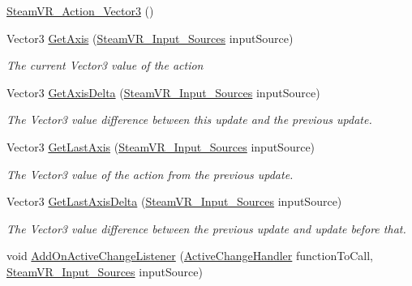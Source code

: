 \begin{DoxyCompactItemize}
\item 
\mbox{\hyperlink{class_valve_1_1_v_r_1_1_steam_v_r___action___vector3_ad1151513dd5f37e8d04c7db2ee98590c}{Steam\+V\+R\+\_\+\+Action\+\_\+\+Vector3}} ()
\item 
Vector3 \mbox{\hyperlink{class_valve_1_1_v_r_1_1_steam_v_r___action___vector3_ade2feaacf2acea8cd4baceb3d861fa20}{Get\+Axis}} (\mbox{\hyperlink{namespace_valve_1_1_v_r_a82e5bf501cc3aa155444ee3f0662853f}{Steam\+V\+R\+\_\+\+Input\+\_\+\+Sources}} input\+Source)
\begin{DoxyCompactList}\small\item\em The current Vector3 value of the action \end{DoxyCompactList}\item 
Vector3 \mbox{\hyperlink{class_valve_1_1_v_r_1_1_steam_v_r___action___vector3_ac8df802433c105f70c635dd4919cf433}{Get\+Axis\+Delta}} (\mbox{\hyperlink{namespace_valve_1_1_v_r_a82e5bf501cc3aa155444ee3f0662853f}{Steam\+V\+R\+\_\+\+Input\+\_\+\+Sources}} input\+Source)
\begin{DoxyCompactList}\small\item\em The Vector3 value difference between this update and the previous update. \end{DoxyCompactList}\item 
Vector3 \mbox{\hyperlink{class_valve_1_1_v_r_1_1_steam_v_r___action___vector3_aa1b08a373d780aa48b52284b65e59434}{Get\+Last\+Axis}} (\mbox{\hyperlink{namespace_valve_1_1_v_r_a82e5bf501cc3aa155444ee3f0662853f}{Steam\+V\+R\+\_\+\+Input\+\_\+\+Sources}} input\+Source)
\begin{DoxyCompactList}\small\item\em The Vector3 value of the action from the previous update. \end{DoxyCompactList}\item 
Vector3 \mbox{\hyperlink{class_valve_1_1_v_r_1_1_steam_v_r___action___vector3_a0c287b4a3eb4bffb3da860ae73f28981}{Get\+Last\+Axis\+Delta}} (\mbox{\hyperlink{namespace_valve_1_1_v_r_a82e5bf501cc3aa155444ee3f0662853f}{Steam\+V\+R\+\_\+\+Input\+\_\+\+Sources}} input\+Source)
\begin{DoxyCompactList}\small\item\em The Vector3 value difference between the previous update and update before that. \end{DoxyCompactList}\item 
void \mbox{\hyperlink{class_valve_1_1_v_r_1_1_steam_v_r___action___vector3_a0550e34179c1058ff63dea2e2305133e}{Add\+On\+Active\+Change\+Listener}} (\mbox{\hyperlink{class_valve_1_1_v_r_1_1_steam_v_r___action___vector3_a47d6c1c558fb45841cd626df9ab3dcb9}{Active\+Change\+Handler}} function\+To\+Call, \mbox{\hyperlink{namespace_valve_1_1_v_r_a82e5bf501cc3aa155444ee3f0662853f}{Steam\+V\+R\+\_\+\+Input\+\_\+\+Sources}} input\+Source)

\end{DoxyCompactItemize}
